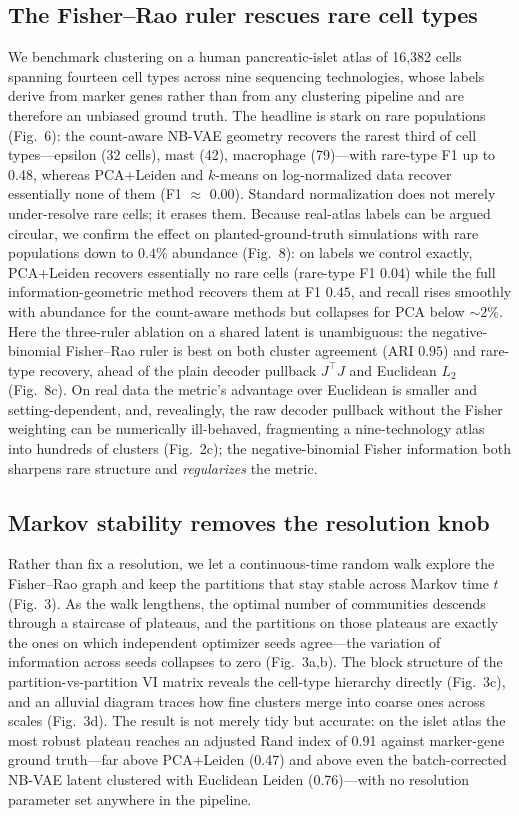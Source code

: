 \documentclass[11pt]{article}
\newcommand{\panrlat}{0.48}     %
\newcommand{\panrpca}{0.00}     %
\newcommand{\markovari}{0.91}   %
\newcommand{\pcaari}{0.47}      %
\newcommand{\euclari}{0.76}     %
\begin{document}
\subsection{The Fisher--Rao ruler rescues rare cell types}
We benchmark clustering on a human pancreatic-islet atlas of 16{,}382 cells spanning fourteen cell
types across nine sequencing technologies, whose labels derive from marker genes rather than from any
clustering pipeline and are therefore an unbiased ground truth. The headline is stark on rare
populations (Fig.~6): the count-aware NB-VAE geometry recovers the rarest third of cell
types---epsilon (32 cells), mast (42), macrophage (79)---with rare-type F1 up to \panrlat, whereas
PCA+Leiden and $k$-means on log-normalized data recover essentially none of them (F1 $\approx$
\panrpca). Standard normalization does not merely under-resolve rare cells; it erases them.
Because real-atlas labels can be argued circular, we confirm the effect on planted-ground-truth
simulations with rare populations down to $0.4\%$ abundance (Fig.~8): on labels we control exactly,
PCA+Leiden recovers essentially no rare cells (rare-type F1 $0.04$) while the full information-geometric
method recovers them at F1 $0.45$, and recall rises smoothly with abundance for the count-aware methods
but collapses for PCA below $\sim\!2\%$. Here the three-ruler ablation on a shared latent is
unambiguous: the negative-binomial Fisher--Rao ruler is best on both cluster agreement (ARI $0.95$)
and rare-type recovery, ahead of the plain decoder pullback $J^{\!\top}J$ and Euclidean $L_2$
(Fig.~8c). On real data the metric's advantage over Euclidean is smaller and setting-dependent, and,
revealingly, the raw decoder pullback without the Fisher weighting can be numerically ill-behaved,
fragmenting a nine-technology atlas into hundreds of clusters (Fig.~2c); the negative-binomial Fisher
information both sharpens rare structure and \emph{regularizes} the metric.

\subsection{Markov stability removes the resolution knob}
Rather than fix a resolution, we let a continuous-time random walk explore the Fisher--Rao graph and
keep the partitions that stay stable across Markov time $t$ (Fig.~3). As the walk lengthens, the
optimal number of communities descends through a staircase of plateaus, and the partitions on those
plateaus are exactly the ones on which independent optimizer seeds agree---the variation of
information across seeds collapses to zero (Fig.~3a,b). The block structure of the
partition-vs-partition VI matrix reveals the cell-type hierarchy directly (Fig.~3c), and an alluvial
diagram traces how fine clusters merge into coarse ones across scales (Fig.~3d). The result is not
merely tidy but accurate: on the islet atlas the most robust plateau reaches an adjusted Rand index
of \markovari{} against marker-gene ground truth---far above PCA+Leiden (\pcaari) and above even the
batch-corrected NB-VAE latent clustered with Euclidean Leiden (\euclari)---with no resolution
parameter set anywhere in the pipeline.
\end{document}
